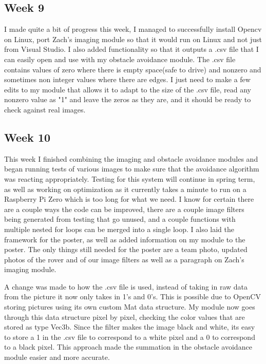 \documentclass[10pt,letterpaper,onecolumn,draftclsnofoot,journal]{IEEEtran}
\begin{document}
\subsection{Week 9}
I made quite a bit of progress this week, I managed to successfully install Opencv on Linux, port Zach's imaging module so that it would run on Linux and not just from Visual Studio. I also added functionality so that it outputs a .csv file that I can easily open and use with my obstacle avoidance module. The .csv file contains values of zero where there is empty space(safe to drive) and nonzero and sometimes non integer values where there are edges. I just need to make a few edits to my module that allows it to adapt to the size of the .csv file, read any nonzero value as "1" and leave the zeros as they are, and it should be ready to check against real images.

\subsection{Week 10}
This week I finished combining the imaging and obstacle avoidance modules and began running tests of various images to make sure that the avoidance algorithm was reacting appropriately. Testing for this system will continue in spring term, as well as working on optimization as it currently takes a minute to run on a Raspberry Pi Zero which is too long for what we need. I know for certain there are a couple ways the code can be improved, there are a couple image filters being generated from testing that go unused, and a couple functions with multiple nested for loops can be merged into a single loop. I also laid the framework for the poster, as well as added information on my module to the poster. The only things still needed for the poster are a team photo, updated photos of the rover and of our image filters as well as a paragraph on Zach's imaging module.
\par
A change was made to how the .csv file is used, instead of taking in raw data from the picture it now only takes in 1's and 0's. This is possible due to OpenCV storing pictures using its own custom Mat data structure. My module now goes through this data structure pixel by pixel, checking the color values that are stored as type Vec3b. Since the filter makes the image black and white, its easy to store a 1 in the .csv file to correspond to a white pixel and a 0 to correspond to a black pixel. This approach made the summation in the obstacle avoidance module easier and more accurate.
\end{document}
